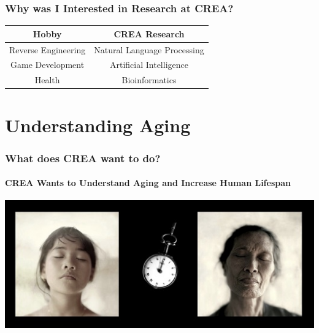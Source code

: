 \documentclass[mathserif]{beamer}
\begin{document}
\begin{frame}

\frametitle{Why was I Interested in Research at CREA?}

\centering
\begin{tabular}{ c | c }
Hobby & CREA Research \\
\hline
Reverse Engineering & Natural Language Processing\\
Game Development & Artificial Intelligence\\
Health & Bioinformatics\\
\end{tabular}

\end{frame}

\section{Understanding Aging}

\begin{frame}

\frametitle{What does CREA want to do?}
\framesubtitle{CREA Wants to Understand Aging and Increase Human Lifespan}

\centering

\includegraphics[width=0.75\linewidth]{images/aging.jpg}


\end{frame}
\end{document}
